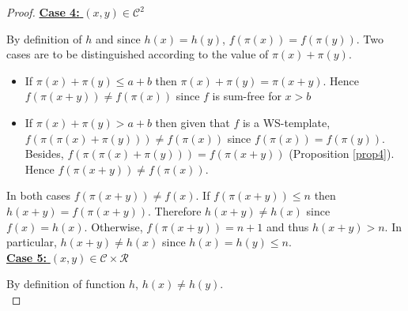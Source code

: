 \documentclass[final,onefignum,onetabnum]{siamart190516}
\begin{document}
\begin{proof}
\noindent \underline{\textbf{Case 4:} \((x,y) \in \mathcal{C}^2\)}
\par
By definition of \(h\) and since \(h(x)=h(y)\), \(f(\pi(x)) = f(\pi(y))\). Two cases are to be distinguished according
to the value of \(\pi(x)+\pi(y)\).
\begin{itemize}
\item If \(\pi(x) + \pi(y) \leqslant a+b\) then \(\pi(x)+\pi(y) = \pi(x + y)\). Hence \(f(\pi(x + y)) \neq f(\pi(x))\) since
	\(f\) is sum-free for \(x>b\)
\item \begin{sloppypar}
	If \(\pi(x)+\pi(y)>a+b\) then given that \(f\) is a WS-template, \({f(\pi(\pi(x)+\pi(y))) \neq f(\pi(x))}\) since
	\({f(\pi(x)) = f(\pi(y))}\). Besides,  \({f(\pi(\pi(x)+\pi(y))) = f(\pi(x + y))}\) (Proposition \ref{prop4}). Hence \({f(\pi(x + y))
	\neq  f(\pi(x))}\).
	\end{sloppypar}
\end{itemize}
\par
In both cases \(f(\pi(x+y)) \neq f(x)\). If  \(f(\pi(x+y)) \leqslant n\) then \(h(x+y) = f(\pi(x+y))\). Therefore
\(h(x+y) \neq h(x)\) since \(f(x) = h(x)\). Otherwise, \(f(\pi(x+y)) = n + 1\) and thus \(h(x+y) > n\). In particular,
\(h(x + y) \neq h(x)\) since \(h(x) = h(y) \leqslant n\). \\

\noindent \underline{\textbf{Case 5:} \((x,y) \in \mathcal{C} \times \mathcal{R}\)}
\par
By definition of function \(h\), \(h(x) \neq h(y)\).\\


\end{proof}
\end{document}
